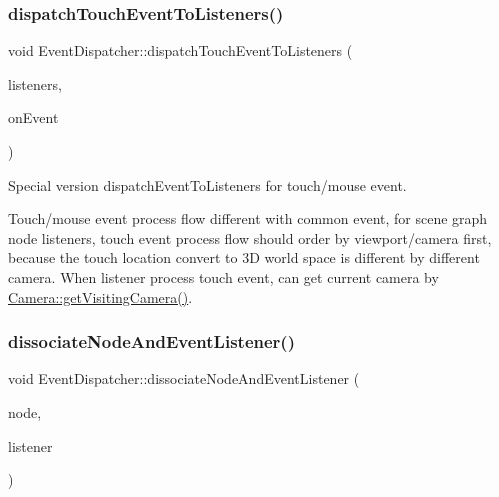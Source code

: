 \subsubsection{\texorpdfstring{dispatch\+Touch\+Event\+To\+Listeners()}{dispatchTouchEventToListeners()}\hspace{0.1cm}{\footnotesize\ttfamily [2/2]}}
{\footnotesize\ttfamily void Event\+Dispatcher\+::dispatch\+Touch\+Event\+To\+Listeners (\begin{DoxyParamCaption}\item[{\hyperlink{classEventDispatcher_1_1EventListenerVector}{Event\+Listener\+Vector} $\ast$}]{listeners,  }\item[{const std\+::function$<$ bool(\hyperlink{classEventListener}{Event\+Listener} $\ast$)$>$ \&}]{on\+Event }\end{DoxyParamCaption})\hspace{0.3cm}{\ttfamily [protected]}}

Special version dispatch\+Event\+To\+Listeners for touch/mouse event.

Touch/mouse event process flow different with common event, for scene graph node listeners, touch event process flow should order by viewport/camera first, because the touch location convert to 3D world space is different by different camera. When listener process touch event, can get current camera by \hyperlink{classCamera_a71a044ac0a08723ac89ca69deb460f47}{Camera\+::get\+Visiting\+Camera()}. \mbox{\label{classEventDispatcher_a43a5aaec61fcbec266dc62a50de7cbad}} 
\subsubsection{\texorpdfstring{dissociate\+Node\+And\+Event\+Listener()}{dissociateNodeAndEventListener()}\hspace{0.1cm}{\footnotesize\ttfamily [1/2]}}
{\footnotesize\ttfamily void Event\+Dispatcher\+::dissociate\+Node\+And\+Event\+Listener (\begin{DoxyParamCaption}\item[{\hyperlink{classNode}{Node} $\ast$}]{node,  }\item[{\hyperlink{classEventListener}{Event\+Listener} $\ast$}]{listener }\end{DoxyParamCaption})\hspace{0.3cm}{\ttfamily [protected]}}

